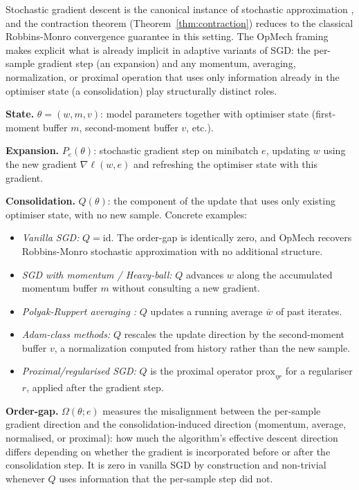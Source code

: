 \documentclass[12pt,a4paper]{article}
\newcommand{\Ogap}{\Omega}
\begin{document}
Stochastic gradient descent is the canonical instance of stochastic
approximation \citep{robbins1951stochastic,borkar2008stochastic}, and the
contraction theorem (Theorem~\ref{thm:contraction}) reduces to the classical
Robbins-Monro convergence guarantee in this setting. The OpMech framing makes
explicit what is already implicit in adaptive variants of SGD: the per-sample
gradient step (an expansion) and any momentum, averaging, normalization, or
proximal operation that uses only information already in the optimiser state
(a consolidation) play structurally distinct roles.

\textbf{State.}
$\theta = (w, m, v)$: model parameters together with optimiser state
(first-moment buffer $m$, second-moment buffer $v$, etc.).

\textbf{Expansion.}
$P_e(\theta)$: stochastic gradient step on minibatch $e$, updating $w$ using
the new gradient $\nabla \ell(w, e)$ and refreshing the optimiser state with
this gradient.

\textbf{Consolidation.}
$Q(\theta)$: the component of the update that uses only existing optimiser
state, with no new sample. Concrete examples:
\begin{itemize}
\item \emph{Vanilla SGD:} $Q = \mathrm{id}$. The order-gap is identically
  zero, and OpMech recovers Robbins-Monro stochastic approximation with
  no additional structure.
\item \emph{SGD with momentum / Heavy-ball:} $Q$ advances $w$ along the
  accumulated momentum buffer $m$ without consulting a new gradient.
\item \emph{Polyak-Ruppert averaging \citep{polyak1992averaging}:} $Q$
  updates a running average $\bar w$ of past iterates.
\item \emph{Adam-class methods:} $Q$ rescales the update direction by the
  second-moment buffer $v$, a normalization computed from history rather
  than the new sample.
\item \emph{Proximal/regularised SGD:} $Q$ is the proximal operator
  $\mathrm{prox}_{\eta r}$ for a regulariser $r$, applied after the gradient
  step.
\end{itemize}

\textbf{Order-gap.}
$\Ogap(\theta; e)$ measures the misalignment between the per-sample
gradient direction and the consolidation-induced direction (momentum,
average, normalised, or proximal): how much the algorithm's effective
descent direction differs depending on whether the gradient is incorporated
before or after the consolidation step. It is zero in vanilla SGD by
construction and non-trivial whenever $Q$ uses information that the
per-sample step did not.
\end{document}
